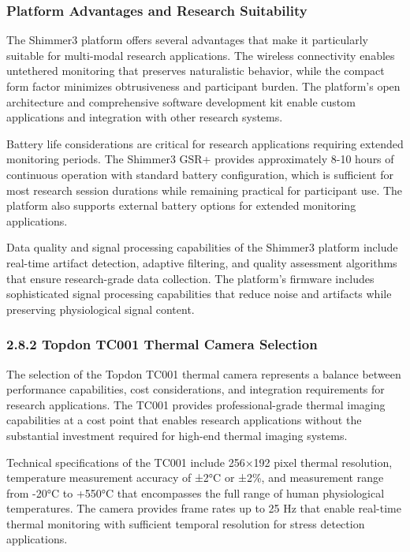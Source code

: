 \documentclass[11pt,a4paper]{article}
\begin{document}
\subsubsection{Platform Advantages and Research Suitability}

The Shimmer3 platform offers several advantages that make it particularly suitable for multi-modal research
applications. The wireless connectivity enables untethered monitoring that preserves naturalistic behavior, while the
compact form factor minimizes obtrusiveness and participant burden. The platform's open architecture and comprehensive
software development kit enable custom applications and integration with other research systems.

Battery life considerations are critical for research applications requiring extended monitoring periods. The Shimmer3
GSR+ provides approximately 8-10 hours of continuous operation with standard battery configuration, which is sufficient
for most research session durations while remaining practical for participant use. The platform also supports external
battery options for extended monitoring applications.

Data quality and signal processing capabilities of the Shimmer3 platform include real-time artifact detection, adaptive
filtering, and quality assessment algorithms that ensure research-grade data collection. The platform's firmware
includes sophisticated signal processing capabilities that reduce noise and artifacts while preserving physiological
signal content.

\subsubsection{2.8.2 Topdon TC001 Thermal Camera Selection}

The selection of the Topdon TC001 thermal camera represents a balance between performance capabilities, cost
considerations, and integration requirements for research applications. The TC001 provides professional-grade thermal
imaging capabilities at a cost point that enables research applications without the substantial investment required for
high-end thermal imaging systems.

Technical specifications of the TC001 include 256×192 pixel thermal resolution, temperature measurement accuracy of ±2°C
or ±2\%, and measurement range from -20°C to +550°C that encompasses the full range of human physiological temperatures.
The camera provides frame rates up to 25 Hz that enable real-time thermal monitoring with sufficient temporal resolution
for stress detection applications.
\end{document}
